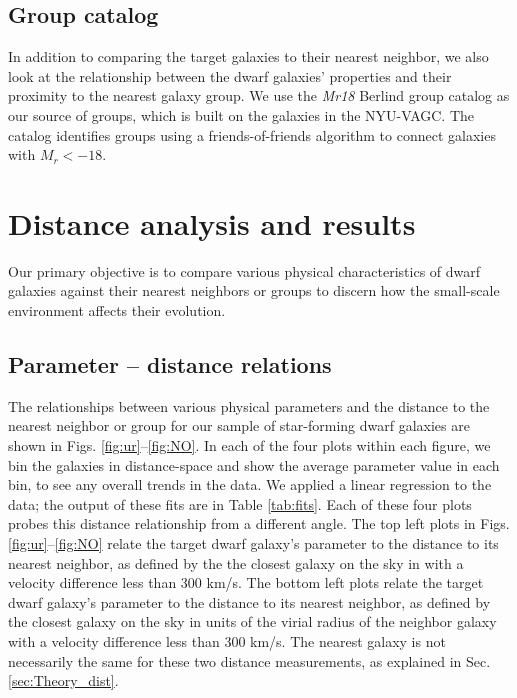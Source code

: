 \subsection{Group catalog}

In addition to comparing the target galaxies to their nearest neighbor, we also 
look at the relationship between the dwarf galaxies' properties and their 
proximity to the nearest galaxy group.  We use the \emph{Mr18} Berlind group 
catalog \cite{Berlind06} as our source of groups, which is built on the galaxies 
in the NYU-VAGC. The catalog identifies groups using a friends-of-friends 
algorithm \citep{Huchra82} to connect galaxies with $M_r < -18$.




\section[Results]{Distance analysis and results}

Our primary objective is to compare various physical characteristics of dwarf 
galaxies against their nearest neighbors or groups to discern how the 
small-scale environment affects their evolution.


\subsection{Parameter -- distance relations}\label{sec:Relations}

The relationships between various physical parameters and the distance to the 
nearest neighbor or group for our sample of star-forming dwarf galaxies are 
shown in Figs. \ref{fig:ur}--\ref{fig:NO}.  In each of the four plots within 
each figure, we bin the galaxies in distance-space and show the average 
parameter value in each bin, to see any overall trends in the data.  We applied 
a linear regression to the data; the output of these fits are in Table 
\ref{tab:fits}.  Each of these four plots probes this distance relationship from 
a different angle.  The top left plots in Figs. \ref{fig:ur}--\ref{fig:NO} 
relate the target dwarf galaxy's parameter to the distance to its nearest 
neighbor, as defined by the the closest galaxy on the sky in \hMpc with a 
velocity difference less than 300 km/s.  The bottom left plots relate the target 
dwarf galaxy's parameter to the distance to its nearest neighbor, as defined by 
the closest galaxy on the sky in units of the virial radius of the neighbor 
galaxy with a velocity difference less than 300 km/s.  The nearest galaxy is not 
necessarily the same for these two distance measurements, as explained in Sec. 
\ref{sec:Theory_dist}.


